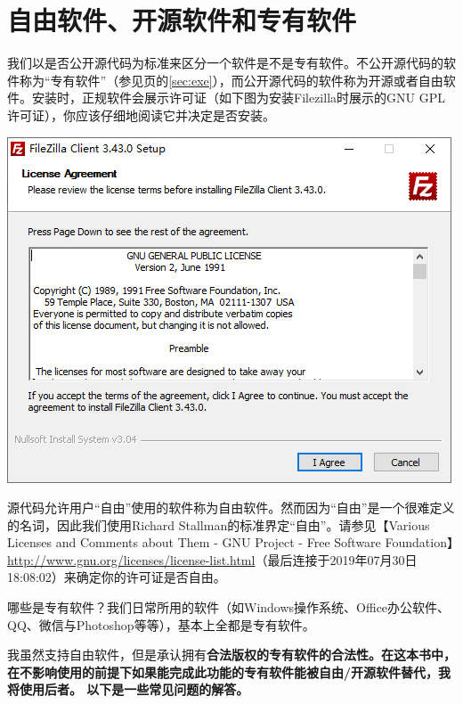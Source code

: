 \section{自由软件、开源软件和专有软件}
我们以是否公开源代码为标准来区分一个软件是不是专有软件。不公开源代码的软件称为“专有软件”（参见\pageref{sec:exe}页的\ref{sec:exe}），而公开源代码的软件称为开源或者自由软件。安装时，正规软件会展示许可证（如下图为安装Filezilla时展示的GNU GPL许可证），你应该仔细地阅读它并决定是否安装。
\begin{center}
	\includegraphics[scale=0.3]{pic/fzi}
\end{center}\par
源代码允许用户“自由”使用的软件称为自由软件。然而因为“自由”是一个很难定义的名词，因此我们使用Richard Stallman的标准界定“自由”。请参见【Various Licenses and Comments about Them - GNU Project - Free Software Foundation】\url{http://www.gnu.org/licenses/license-list.html}（最后连接于2019年07月30日18:08:02）来确定你的许可证是否自由。\par
哪些是专有软件？我们日常所用的软件（如Windows操作系统、Office办公软件、QQ、微信与Photoshop等等），基本上全都是专有软件。\par
我虽然支持自由软件，但是承认拥有\bf 合法版权\normalall 的专有软件的合法性。在这本书中，在\bf 不影响使用\normalall 的前提下如果能完成此功能的专有软件能被自由/开源软件替代，我将使用后者。
以下是一些常见问题的解答。
